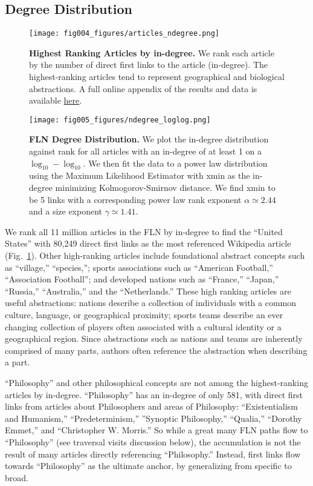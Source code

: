 \documentclass[pre,twocolumn,twoside,superscriptaddress,floatfix]{revtex4-1}
\begin{document}
{\subsection{Degree Distribution}

\begin{figure}[tp!]
  \texttt{[image: fig004\_figures/articles\_ndegree.png]}
  \caption{
    \textbf{Highest Ranking Articles by in-degree.}
    We rank each article by the number of direct first links to the article (in-degree). The highest-ranking articles tend to represent geographical and biological abstractions. A full online appendix of the results and data is available \href{http://compstorylab.org/share/papers/ibrahim2016a/index.html}{here}.}
  \label{fig:indegree list}
\end{figure}

\begin{figure}[tp!]
  \texttt{[image: fig005\_figures/ndegree\_loglog.png]}
  \caption{
    \textbf{FLN Degree Distribution.}
    We plot the in-degree distribution against rank for all articles with an in-degree of at least 1 on a $\log_{10}-\log_{10}$. We then fit the data to a power law 
    distribution using the Maximum Likelihood Estimator with xmin as the in-degree minimizing Kolmogorov-Smirnov distance. We find xmin to be 5 links with a corresponding power law rank exponent $\alpha \simeq 2.44$ and a size exponent $\gamma \simeq 1.41$.
}
  \label{fig:degree distribution}
\end{figure}

We rank all 11 million articles in the FLN by in-degree to find 
the ``United States'' with 80,249 direct first links as the most referenced
Wikipedia article 
(Fig.~\ref{fig:indegree list}). 
Other high-ranking articles
include foundational abstract concepts such as ``village,'' ``species,''; 
sports associations such as ``American Football,'' ``Association Football''; 
and developed nations such as ``France,'' ``Japan,'' ``Russia,'' ``Australia,'' and 
the ``Netherlands.'' These high ranking articles are useful abstractions: nations
describe a collection of individuals with a common culture, language, or 
geographical proximity; sports teams describe an ever changing collection of 
players often associated with a cultural identity or a geographical 
region. 
Since abstractions such as nations and teams are inherently comprised
of many parts, authors often reference the abstraction when describing a part.

``Philosophy'' and other philosophical concepts
are not among the highest-ranking articles by in-degree.
``Philosophy'' has an in-degree of only 581, with direct first links from articles about Philosophers and areas of Philosophy: ``Existentialism and Humanism,'' ``Predeterminism,'' ''Synoptic Philosophy,'' ``Qualia,'' ``Dorothy Emmet,'' and ``Christopher W. Morris.''
So while a great many FLN paths flow to 
``Philosophy'' (see traversal visits discussion below), 
the accumulation is not the 
result of many articles directly referencing ``Philosophy.'' 
Instead, first links flow towards ``Philosophy'' as the 
ultimate anchor, by generalizing from specific to broad.

}
\end{document}
